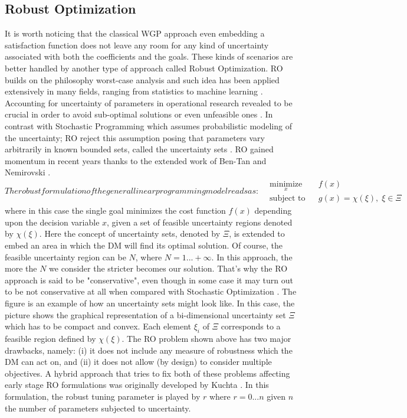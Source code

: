 \documentclass[conference,final,]{IEEEtran}
\begin{document}
\hypertarget{robust-optimization}{%
\subsection{Robust Optimization}\label{robust-optimization}}
It is worth noticing that the classical WGP approach even embedding a satisfaction function does not leave any room for any kind of uncertainty associated with both the coefficients and the goals. These kinds of scenarios are better handled by another type of approach called Robust Optimization. RO builds on the philosophy worst-case analysis and such idea has been applied extensively in many fields, ranging from statistics \cite{huber64} to machine learning \cite{vapnik63}\cite{tibshirani96}. Accounting for uncertainty of parameters in operational research revealed to be crucial in order to avoid sub-optimal solutions or even unfeasible ones \cite{ben-tal00}. In contrast with Stochastic Programming \cite{dantzig55} which assumes probabilistic modeling of the uncertainty; RO reject this assumption posing that parameters vary arbitrarily in known bounded sets, called the uncertainty sets \cite{soyster73}. RO gained momentum in recent years thanks to the extended work of Ben-Tan and Nemirovski \cite{ben-tal97}\cite{ben-tal98}\cite{ben-tal99}.
\begin{subequations}
The robust formulation of the general linear programming model reads as:
\begin{align}
    & \underset{x}{\text{minimize}} & & f(x) \label{rpmin} \\
    & \text{subject to} & & g(x)=\chi(\xi), \; \xi \in \Xi \label{rpcon}
\end{align}
\end{subequations}
where in this case the single goal minimizes the cost function $f(x)$ depending upon the decision variable $x$, given a set of feasible uncertainty regions denoted by $\chi(\xi)$. Here the concept of uncertainty sets, denoted by $\Xi$, is extended to embed an area in which the DM will find its optimal solution. Of course, the feasible uncertainty region can be $N$, where $N=1...+\infty$. In this approach, the more the $N$ we consider the stricter becomes our solution. That's why the RO approach is said to be "conservative", even though in some case it may turn out to be not conservative at all when compared with Stochastic Optimization \cite{ben-tal09}. The figure is an example of how an uncertainty sets might look like. In this case, the picture shows the graphical representation of a bi-dimensional uncertainty set \(\Xi\) which has to be compact and convex. Each element \(\xi_i\) of \(\Xi\) corresponds to a feasible region defined by \(\chi(\xi)\). The RO problem shown above has two major drawbacks, namely: (i) it does not include any measure of robustness which the DM can act on, and (ii) it does not allow (by design) to consider multiple objectives. A hybrid approach that tries to fix both of these problems affecting early stage RO formulations was originally developed by Kuchta \cite{kuchta04}. In this formulation, the robust tuning parameter is played by \(r\) where \(r=0...n\) given \(n\) the number of parameters subjected to uncertainty.
\end{document}
